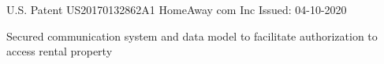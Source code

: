 


\begin{cventries}


\cventry
{U.S. Patent} %
{US20170132862A1} %
{HomeAway com Inc} %
{Issued: 04-10-2020} %
{ %
\begin{cvitems}
\item {Secured communication system and data model to facilitate authorization to access rental property}
\end{cvitems}
}

\end{cventries}